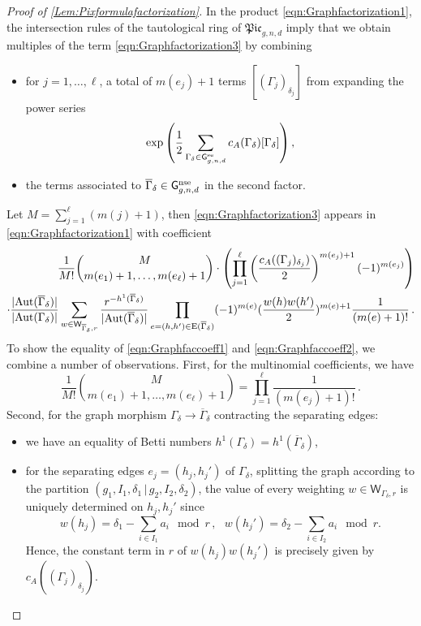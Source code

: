 \documentclass[a4paper,12pt]{article} %
\def\Aut{{\rm Aut}}
\def\E{\mathrm{E}}
\def\G{\mathsf{G}}
\theoremstyle{definition}
\theoremstyle{plain}%
\newcommand{\Picabs}{\mathfrak{Pic}}
\begin{document}
\begin{proof}[Proof of \cref{Lem:Pixformulafactorization}]
In the product \eqref{eqn:Graphfactorization1}, the intersection rules of the tautological ring of $\Picabs_{g,n,d}$ imply that we obtain multiples of the term \eqref{eqn:Graphfactorization3} by combining 
\begin{itemize}
    \item for $j=1, \ldots, \ell$, a total of $m(e_j)+1$ terms $[(\Gamma_j)_{\delta_j}]$ from expanding the power series \[\exp\left(\frac12  \sum_{\Gamma_\delta \in \G_{g,n,d}^\textup{se}} c_A(\Gamma_\delta) [\Gamma_\delta]  \right),\]
    \item the terms associated to $\overline{\Gamma}_{\delta} \in \G_{g,n,d}^\textup{nse}$ in the second factor.
\end{itemize}
Let $M=\sum_{j=1}^\ell (m(j)+1)$, then \eqref{eqn:Graphfactorization3} appears in \eqref{eqn:Graphfactorization1} with coefficient
\begin{align} \label{eqn:Graphfaccoeff2}
    \frac{1}{M!}\binom{M}{m(e_1)+1, \ldots, m(e_\ell)+1} \cdot \left( \prod_{j=1}^\ell \left(\frac{c_A((\Gamma_j)_{\delta_j})}{2}\right)^{m(e_j)+1} (-1)^{m(e_j)} \right)\\ \nonumber \cdot \frac{|\Aut(\overline{\Gamma}_\delta)|}{|\Aut({\Gamma}_\delta)|} \sum_{
w\in \mathsf{W}_{\overline{\Gamma}_\delta,r}}
\frac{r^{-h^1(\overline{\Gamma}_\delta)}}{|\Aut(\overline{\Gamma}_\delta)| }
\prod_{e=(h,h')\in \E(\overline{\Gamma}_\delta)}
 (-1)^{m(e)} (\frac{w(h)w(h')}{2})^{m(e)+1} \frac{1}{(m(e)+1)!}\, .
\end{align}
To show the equality of \eqref{eqn:Graphfaccoeff1} and \eqref{eqn:Graphfaccoeff2}, we combine a number of observations. First, for the multinomial coefficients, we have
\[\frac{1}{M!}\binom{M}{m(e_1)+1, \ldots, m(e_\ell)+1} = \prod_{j=1}^\ell \frac{1}{(m(e_j)+1)!}\, .\]
Second, for the graph morphism $\Gamma_\delta \to \overline{\Gamma}_\delta$ contracting the separating edges:
\begin{itemize}
    \item we have an equality of Betti numbers $h^1(\Gamma_\delta) = h^1(\overline{\Gamma}_\delta)$,
    \item for the separating edges $e_j=(h_j, h_j')$ of  $\Gamma_\delta$, splitting the graph according to the partition $(g_1, I_1, \delta_1\,  | \, g_2, I_2, \delta_2)$, the value of every weighting $w\in \mathsf{W}_{\Gamma_\delta,r}$ is uniquely determined on $h_j, h_j'$ since 
    \[w(h_j) = \delta_1 - \sum_{i \in I_1} a_i   \mod r\, ,\ \ \  w(h_j') = \delta_2 - \sum_{i \in I_2} a_i   \mod r.\] Hence, the constant term in $r$ of $w(h_j) w(h_j')$ is precisely given by $c_A((\Gamma_j)_{\delta_j})$. 

\end{itemize}
\end{proof}
\end{document}
